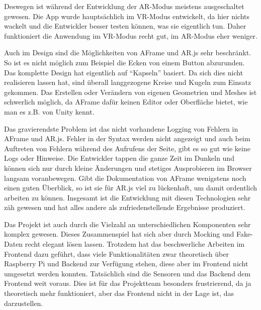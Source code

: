 Deswegen ist während der Entwicklung der AR-Modus meistens ausgeschaltet
gewesen. Die App wurde hauptsächlich im VR-Modus entwickelt, da hier
nichts wackelt und die Entwickler besser testen können, was sie
eigentlich tun. Daher funktioniert die Anwendung im VR-Modus recht gut,
im AR-Modus eher weniger.

Auch im Design sind die Möglichkeiten von AFrame und AR.js sehr
beschränkt. So ist es nicht möglich zum Beispiel die Ecken von einem
Button abzurunden. Das komplette Design hat eigentlich auf ``Kapseln''
basiert. Da sich dies nicht realisieren lassen hat, sind überall
langgezogene Kreise und Kugeln zum Einsatz gekommen. Das Erstellen oder
Verändern von eigenen Geometrien und Meshes ist schwerlich möglich, da
AFrame dafür keinen Editor oder Oberfläche bietet, wie man es z.B. von
Unity kennt.

Das gravierendste Problem ist das nicht vorhandene Logging von Fehlern
in AFrame und AR.js. Fehler in der Syntax werden nicht angezeigt und
auch beim Auftreten von Fehlern während des Aufrufens der Seite, gibt es
so gut wie keine Logs oder Hinweise. Die Entwickler tappen die ganze
Zeit im Dunkeln und können sich nur durch kleine Änderungen und stetiges
Ausprobieren im Browser langsam voranbewegen. Gibt die Dokumentation von
AFrame wenigstens noch einen guten Überblick, so ist sie für AR.js viel
zu lückenhaft, um damit ordentlich arbeiten zu können. Insgesamt ist die
Entwicklung mit diesen Technologien sehr zäh gewesen und hat alles
andere als zufriedenstellende Ergebnisse produziert.

Das Projekt ist auch durch die Vielzahl an unterschiedlichen Komponenten
sehr komplex gewesen. Dieses Zusammenspiel hat sich aber durch Mocking
und Fake-Daten recht elegant lösen lassen. Trotzdem hat das
beschwerliche Arbeiten im Frontend dazu geführt, dass viele
Funktionalitäten zwar theoretisch über Raspberry Pi und Backend zur
Verfügung stehen, diese aber im Frontend nicht umgesetzt werden konnten.
Tatsächlich sind die Sensoren und das Backend dem Frontend weit voraus.
Dies ist für das Projektteam besonders frustrierend, da ja theoretisch
mehr funktioniert, aber das Frontend nicht in der Lage ist, das
darzustellen.
